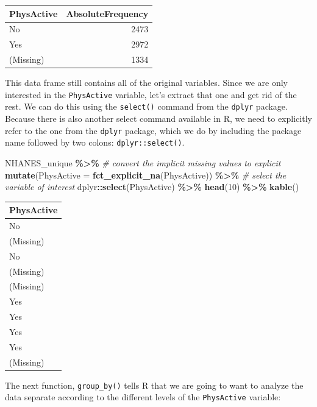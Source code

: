 \documentclass[
  12pt,
]{book}
\newenvironment{Shaded}{\begin{snugshade}}{\end{snugshade}}
\newcommand{\AttributeTok}[1]{\textcolor[rgb]{0.13,0.29,0.53}{#1}}
\newcommand{\CommentTok}[1]{\textcolor[rgb]{0.56,0.35,0.01}{\textit{#1}}}
\newcommand{\DecValTok}[1]{\textcolor[rgb]{0.00,0.00,0.81}{#1}}
\newcommand{\FunctionTok}[1]{\textcolor[rgb]{0.13,0.29,0.53}{\textbf{#1}}}
\newcommand{\NormalTok}[1]{#1}
\newcommand{\SpecialCharTok}[1]{\textcolor[rgb]{0.81,0.36,0.00}{\textbf{#1}}}
\begin{document}
\begin{tabular}{l|r}
\hline
PhysActive & AbsoluteFrequency\\
\hline
No & 2473\\
\hline
Yes & 2972\\
\hline
(Missing) & 1334\\
\hline
\end{tabular}

This data frame still contains all of the original variables. Since we are only interested in the \texttt{PhysActive} variable, let's extract that one and get rid of the rest. We can do this using the \texttt{select()} command from the \texttt{dplyr} package. Because there is also another select command available in R, we need to explicitly refer to the one from the \texttt{dplyr} package, which we do by including the package name followed by two colons: \texttt{dplyr::select()}.

\begin{Shaded}
\begin{Highlighting}[]
\NormalTok{NHANES\_unique }\SpecialCharTok{\%\textgreater{}\%}
  \CommentTok{\# convert the implicit missing values to explicit}
  \FunctionTok{mutate}\NormalTok{(}\AttributeTok{PhysActive =} \FunctionTok{fct\_explicit\_na}\NormalTok{(PhysActive)) }\SpecialCharTok{\%\textgreater{}\%}
  \CommentTok{\# select the variable of interest}
\NormalTok{  dplyr}\SpecialCharTok{::}\FunctionTok{select}\NormalTok{(PhysActive) }\SpecialCharTok{\%\textgreater{}\%} 
  \FunctionTok{head}\NormalTok{(}\DecValTok{10}\NormalTok{) }\SpecialCharTok{\%\textgreater{}\%}
  \FunctionTok{kable}\NormalTok{()}
\end{Highlighting}
\end{Shaded}

\begin{tabular}{l}
\hline
PhysActive\\
\hline
No\\
\hline
(Missing)\\
\hline
No\\
\hline
(Missing)\\
\hline
(Missing)\\
\hline
Yes\\
\hline
Yes\\
\hline
Yes\\
\hline
Yes\\
\hline
(Missing)\\
\hline
\end{tabular}

The next function, \texttt{group\_by()} tells R that we are going to want to analyze the data separate according to the different levels of the \texttt{PhysActive} variable:
\end{document}
